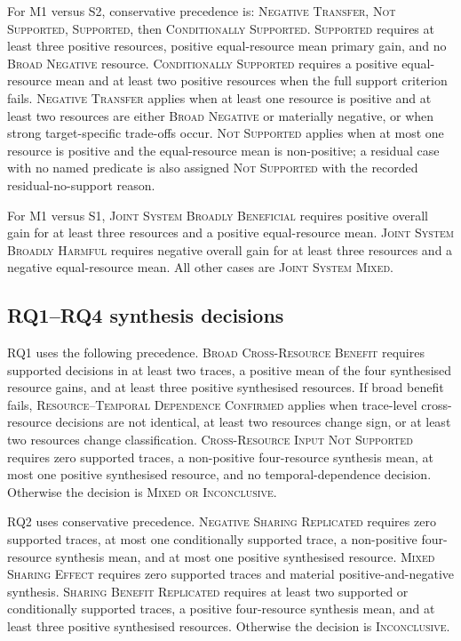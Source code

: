 For M1 versus S2, conservative precedence is: \textsc{Negative Transfer},
\textsc{Not Supported}, \textsc{Supported}, then \textsc{Conditionally
Supported}.  \textsc{Supported} requires at least three positive resources,
positive equal-resource mean primary gain, and no \textsc{Broad Negative}
resource.  \textsc{Conditionally Supported} requires a positive equal-resource
mean and at least two positive resources when the full support criterion fails.
\textsc{Negative Transfer} applies when at least one resource is positive and
at least two resources are either \textsc{Broad Negative} or materially
negative, or when strong target-specific trade-offs occur.  \textsc{Not
Supported} applies when at most one resource is positive and the equal-resource
mean is non-positive; a residual case with no named predicate is also assigned
\textsc{Not Supported} with the recorded residual-no-support reason.

For M1 versus S1, \textsc{Joint System Broadly Beneficial} requires positive
overall gain for at least three resources and a positive equal-resource mean.
\textsc{Joint System Broadly Harmful} requires negative overall gain for at
least three resources and a negative equal-resource mean.  All other cases are
\textsc{Joint System Mixed}.

\subsection*{RQ1--RQ4 synthesis decisions}

RQ1 uses the following precedence.  \textsc{Broad Cross-Resource Benefit}
requires supported decisions in at least two traces, a positive mean of the
four synthesised resource gains, and at least three positive synthesised
resources.  If broad benefit fails, \textsc{Resource--Temporal Dependence
Confirmed} applies when trace-level cross-resource decisions are not identical,
at least two resources change sign, or at least two resources change
classification.  \textsc{Cross-Resource Input Not Supported} requires zero
supported traces, a non-positive four-resource synthesis mean, at most one
positive synthesised resource, and no temporal-dependence decision.  Otherwise
the decision is \textsc{Mixed or Inconclusive}.

RQ2 uses conservative precedence.  \textsc{Negative Sharing Replicated}
requires zero supported traces, at most one conditionally supported trace, a
non-positive four-resource synthesis mean, and at most one positive synthesised
resource.  \textsc{Mixed Sharing Effect} requires zero supported traces and
material positive-and-negative synthesis.  \textsc{Sharing Benefit Replicated}
requires at least two supported or conditionally supported traces, a positive
four-resource synthesis mean, and at least three positive synthesised
resources.  Otherwise the decision is \textsc{Inconclusive}.

